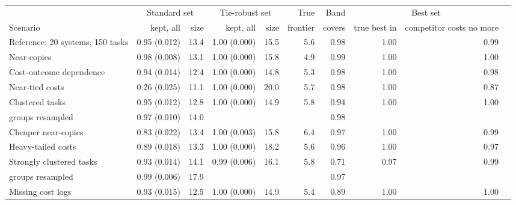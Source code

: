 \begin{tabular}{lrrrrrrrrr}
\toprule
 & \multicolumn{2}{c}{Standard set} & \multicolumn{2}{c}{Tie-robust set} & True & Band & \multicolumn{2}{c}{Best set} \\
Scenario & kept, all & size & kept, all & size & frontier & covers & true best in & competitor costs no more \\
\midrule
Reference: 20 systems, 150 tasks & 0.95 (0.012) & 13.4 & 1.00 (0.000) & 15.5 & 5.6 & 0.98 & 1.00 & 0.99 \\
Near-copies & 0.98 (0.008) & 13.1 & 1.00 (0.000) & 15.8 & 4.9 & 0.99 & 1.00 & 1.00 \\
Cost-outcome dependence & 0.94 (0.014) & 12.4 & 1.00 (0.000) & 14.8 & 5.3 & 0.98 & 1.00 & 0.98 \\
Near-tied costs & 0.26 (0.025) & 11.1 & 1.00 (0.000) & 20.0 & 5.7 & 0.98 & 1.00 & 0.87 \\
Clustered tasks & 0.95 (0.012) & 12.8 & 1.00 (0.000) & 14.9 & 5.8 & 0.94 & 1.00 & 1.00 \\
\quad groups resampled & 0.97 (0.010) & 14.0 & \multicolumn{2}{c}{} & & 0.98 & & \\
Cheaper near-copies & 0.83 (0.022) & 13.4 & 1.00 (0.003) & 15.8 & 6.4 & 0.97 & 1.00 & 0.99 \\
Heavy-tailed costs & 0.89 (0.018) & 13.3 & 1.00 (0.000) & 18.2 & 5.6 & 0.96 & 1.00 & 0.97 \\
Strongly clustered tasks & 0.93 (0.014) & 14.1 & 0.99 (0.006) & 16.1 & 5.8 & 0.71 & 0.97 & 0.99 \\
\quad groups resampled & 0.99 (0.006) & 17.9 & \multicolumn{2}{c}{} & & 0.97 & & \\
Missing cost logs & 0.93 (0.015) & 12.5 & 1.00 (0.000) & 14.9 & 5.4 & 0.89 & 1.00 & 1.00 \\
\bottomrule
\end{tabular}
